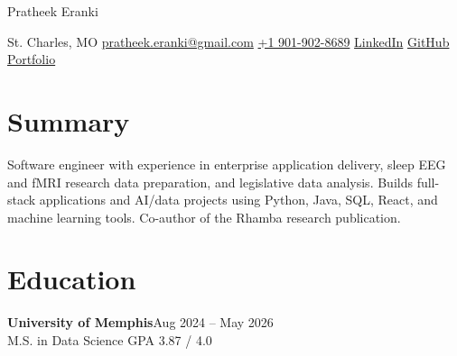 \documentclass[11pt,letterpaper]{article}
\begin{document}
\fontsize{10.5}{12}\selectfont
\begin{center}
{\fontsize{29}{32}\selectfont Pratheek Eranki}\par
\vspace{4pt}

{\small{} St. Charles, MO \textbar{} \href{mailto:pratheek.eranki@gmail.com}{pratheek.eranki@gmail.com} \textbar{} \href{tel:+19019028689}{+1 901-902-8689} \textbar{} \href{https://www.linkedin.com/in/pratheekeranki64/}{LinkedIn} \textbar{} \href{https://github.com/PratheekEranki}{GitHub} \textbar{} \href{https://pratheekeranki.github.io/portfolio/}{Portfolio}}\par\end{center}\vspace{-9pt}
\section*{Summary}
Software engineer with experience in enterprise application delivery, sleep EEG and fMRI research data preparation, and legislative data analysis. Builds full-stack applications and AI/data projects using Python, Java, SQL, React, and machine learning tools. Co-author of the Rhamba research publication.
\section*{Education}
\textbf{University of Memphis}\hfill{\small{}Aug 2024 -- May 2026}\\
M.S. in Data Science\hfill{\small{} GPA 3.87 / 4.0}\par\vspace{2pt}
\end{document}
